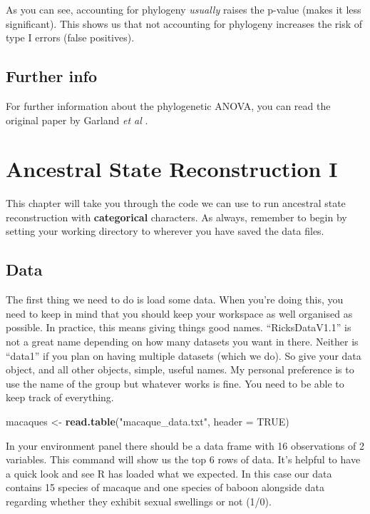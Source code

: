 \documentclass[
]{book}
\newenvironment{Shaded}{\begin{snugshade}}{\end{snugshade}}
\newcommand{\DataTypeTok}[1]{\textcolor[rgb]{0.13,0.29,0.53}{#1}}
\newcommand{\KeywordTok}[1]{\textcolor[rgb]{0.13,0.29,0.53}{\textbf{#1}}}
\newcommand{\NormalTok}[1]{#1}
\newcommand{\OtherTok}[1]{\textcolor[rgb]{0.56,0.35,0.01}{#1}}
\newcommand{\StringTok}[1]{\textcolor[rgb]{0.31,0.60,0.02}{#1}}
\begin{document}
As you can see, accounting for phylogeny \emph{usually} raises the p-value (makes it less significant). This shows us that not accounting for phylogeny increases the risk of type I errors (false positives).

\hypertarget{further-info-1}{%
\section{Further info}\label{further-info-1}}

For further information about the phylogenetic ANOVA, you can read the original paper by Garland \emph{et al} \citeyearpar{garland93}.

\hypertarget{asr1}{%
\chapter{Ancestral State Reconstruction I}\label{asr1}}

This chapter will take you through the code we can use to run ancestral state reconstruction with \textbf{categorical} characters. As always, remember to begin by setting your working directory to wherever you have saved the data files.

\hypertarget{data}{%
\section{Data}\label{data}}

The first thing we need to do is load some data. When you're doing this, you need to keep in mind that you should keep your workspace as well organised as possible. In practice, this means giving things good names. ``RicksDataV1.1'' is not a great name depending on how many datasets you want in there. Neither is ``data1'' if you plan on having multiple datasets (which we do). So give your data object, and all other objects, simple, useful names. My personal preference is to use the name of the group but whatever works is fine. You need to be able to keep track of everything.

\begin{Shaded}
\begin{Highlighting}[]
\NormalTok{macaques \textless{}{-}}\StringTok{ }\KeywordTok{read.table}\NormalTok{(}\StringTok{"macaque\_data.txt"}\NormalTok{, }\DataTypeTok{header =} \OtherTok{TRUE}\NormalTok{)}
\end{Highlighting}
\end{Shaded}

In your environment panel there should be a data frame with 16 observations of 2 variables. This command will show us the top 6 rows of data. It's helpful to have a quick look and see R has loaded what we expected. In this case our data contains 15 species of macaque and one species of baboon alongside data regarding whether they exhibit sexual swellings or not (1/0).
\end{document}
